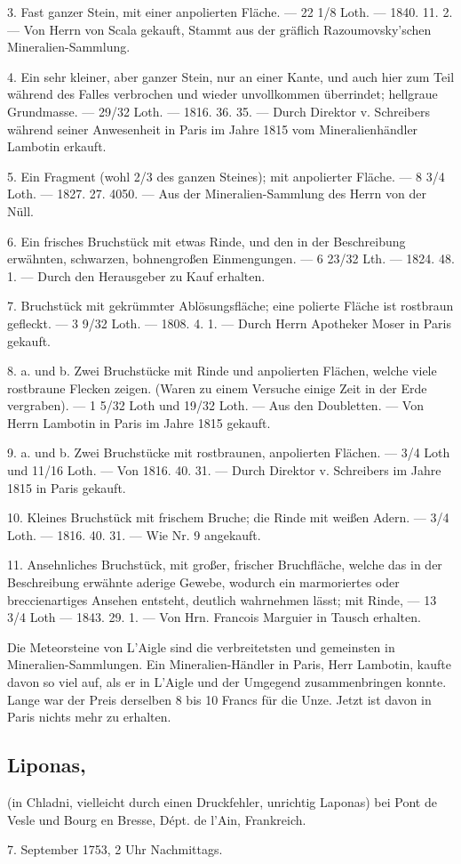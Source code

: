 \documentclass[a4paper, 11pt, oneside, polutonikogreek, german]{article}
\begin{document}
3. Fast ganzer Stein, mit einer anpolierten Fläche. — 22 1/8 Loth. — 1840. 11. 2. — Von Herrn von Scala gekauft, Stammt aus der gräflich Razoumovsky'schen Mineralien-Sammlung.

4. Ein sehr kleiner, aber ganzer Stein, nur an einer Kante, und auch hier zum Teil während des Falles verbrochen und wieder unvollkommen überrindet; hellgraue Grundmasse. — 29/32 Loth. — 1816. 36. 35. — Durch Direktor v. Schreibers während seiner Anwesenheit in Paris im Jahre 1815 vom Mineralienhändler Lambotin erkauft.

5. Ein Fragment (wohl 2/3 des ganzen Steines); mit anpolierter Fläche. — 8 3/4 Loth. — 1827. 27. 4050. — Aus der Mineralien-Sammlung des Herrn von der Nüll.

6. Ein frisches Bruchstück mit etwas Rinde, und den in der Beschreibung erwähnten, schwarzen, bohnengroßen Einmengungen. — 6 23/32 Lth. — 1824. 48. 1. — Durch den Herausgeber zu Kauf erhalten.

7. Bruchstück mit gekrümmter Ablösungsfläche; eine polierte Fläche ist rostbraun gefleckt. — 3 9/32 Loth. — 1808. 4. 1. — Durch Herrn Apotheker Moser in Paris gekauft.

8. a. und b. Zwei Bruchstücke mit Rinde und anpolierten Flächen, welche viele rostbraune Flecken zeigen. (Waren zu einem Versuche einige Zeit in der Erde vergraben). — 1 5/32 Loth und 19/32 Loth. — Aus den Doubletten. — Von Herrn Lambotin in Paris im Jahre 1815 gekauft.

9. a. und b. Zwei Bruchstücke mit rostbraunen, anpolierten Flächen. — 3/4 Loth und 11/16 Loth. — Von 1816. 40. 31. — Durch Direktor v. Schreibers im Jahre 1815 in Paris gekauft.

10. Kleines Bruchstück mit frischem Bruche; die Rinde mit weißen Adern. — 3/4 Loth. — 1816. 40. 31. — Wie Nr. 9 angekauft.

11. Ansehnliches Bruchstück, mit großer, frischer Bruchfläche, welche das in der Beschreibung erwähnte aderige Gewebe, wodurch ein marmoriertes oder breccienartiges Ansehen entsteht, deutlich wahrnehmen lässt; mit Rinde, — 13 3/4 Loth — 1843. 29. 1. — Von Hrn. Francois Marguier in Tausch erhalten.

Die Meteorsteine von L’Aigle sind die verbreitetsten und gemeinsten in Mineralien-Sammlungen. Ein Mineralien-Händler in Paris, Herr Lambotin, kaufte davon so viel auf, als er in L’Aigle und der Umgegend zusammenbringen konnte. Lange war der Preis derselben 8 bis 10 Francs für die Unze. Jetzt ist davon in Paris nichts mehr zu erhalten.
\subsection[Liponas.]{Liponas,}
\begin{center}
\small
(in Chladni, vielleicht durch einen Druckfehler, unrichtig Laponas) bei Pont de Vesle und Bourg en Bresse, Dépt. de l'Ain, Frankreich.

7. September 1753, 2 Uhr Nachmittags.
\end{center}
\end{document}
